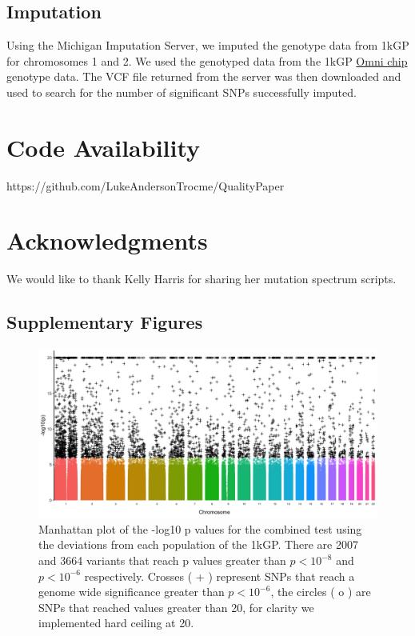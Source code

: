 \documentclass[9pt,lineno]{elife}
\begin{document}
\subsection{Imputation}
Using the Michigan Imputation Server, we imputed the genotype data from 1kGP for chromosomes 1 and 2.
We used the genotyped data from the 1kGP \href{ftp://ftp.1000genomes.ebi.ac.uk/vol1/ftp/release/20130502/supporting/hd_genotype_chip/ALL.chip.omni_broad_sanger_combined.20140818.snps.genotypes.vcf.gz}{Omni chip} genotype data.
The VCF file returned from the server was then downloaded and used to search for the number of significant SNPs successfully imputed.

\section{Code Availability}
https://github.com/LukeAndersonTrocme/QualityPaper

\section{Acknowledgments}
We would like to thank Kelly Harris for sharing her mutation spectrum scripts.





\subsection{Supplementary Figures}
\renewcommand{\thefigure}{S\arabic{figure}}
\setcounter{figure}{0}   	

\begin{figure}
\includegraphics[width=\hsize,keepaspectratio]{./Figures/ManhattanPlot.jpg}

\caption{Manhattan plot of the -log10 p values for the combined test using the deviations from each population of the 1kGP. 
There are 2007 and 3664 variants that reach p values greater than $ p < 10^{-8}$ and $ p < 10^{-6}$ respectively.
Crosses ( + ) represent SNPs that reach a genome wide significance greater than $ p < 10^{-6}$, the circles ( o ) are SNPs that reached values greater than 20, for clarity we implemented hard ceiling at 20.}
  \label{Manhattan}
\end{figure}
\end{document}
